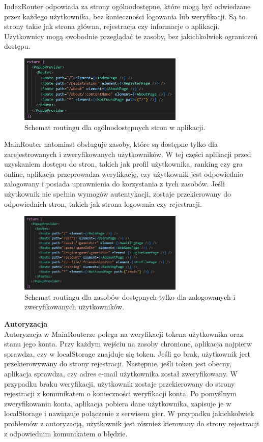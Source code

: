 \documentclass[12pt,a4paper]{article}
\begin{document}
IndexRouter odpowiada za strony ogólnodostępne, które mogą być odwiedzane przez każdego użytkownika, bez konieczności logowania lub weryfikacji. Są to strony takie jak strona główna, rejestracja czy informacje o aplikacji. Użytkownicy mogą swobodnie przeglądać te zasoby, bez jakichkolwiek ograniczeń dostępu.
\begin{figure}[h!]
    \centering
    \includegraphics[width=0.7\textwidth]{zdj/index_router.png}
    \caption{Schemat routingu dla ogólnodostępnych stron w aplikacji.}
\end{figure}

MainRouter natomiast obsługuje zasoby, które są dostępne tylko dla zarejestrowanych i zweryfikowanych użytkowników. W tej części aplikacji przed uzyskaniem dostępu do stron, takich jak profil użytkownika, ranking czy gra online, aplikacja przeprowadza weryfikację, czy użytkownik jest odpowiednio zalogowany i posiada uprawnienia do korzystania z tych zasobów. Jeśli użytkownik nie spełnia wymogów autentykacji, zostaje przekierowany do odpowiednich stron, takich jak strona logowania czy rejestracji.
\begin{figure}[h!]
    \centering
    \includegraphics[width=0.7\textwidth]{zdj/main_router.png}
    \caption{Schemat routingu dla zasobów dostępnych tylko dla zalogowanych i zweryfikowanych użytkowników.}
\end{figure}

\newpage

\textbf{Autoryzacja}\\
Autoryzacja w MainRouterze polega na weryfikacji tokena użytkownika oraz stanu jego konta. Przy każdym wejściu na zasoby chronione, aplikacja najpierw sprawdza, czy w localStorage znajduje się token. Jeśli go brak, użytkownik jest przekierowywany do strony rejestracji. Następnie, jeśli token jest obecny, aplikacja sprawdza, czy adres e-mail użytkownika został zweryfikowany. W przypadku braku weryfikacji, użytkownik zostaje przekierowany do strony rejestracji z komunikatem o konieczności weryfikacji konta. Po pomyślnym zweryfikowaniu konta, aplikacja pobiera dane użytkownika, zapisuje je w localStorage i nawiązuje połączenie z serwisem gier. W przypadku jakichkolwiek problemów z autoryzacją, użytkownik jest również kierowany do strony rejestracji z odpowiednim komunikatem o błędzie.
\end{document}
